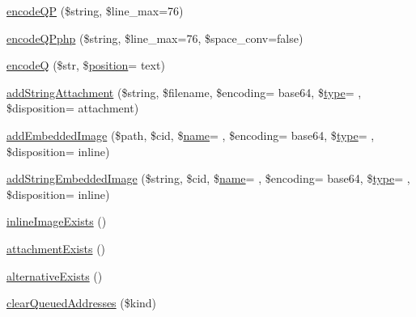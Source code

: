 \begin{DoxyCompactItemize}
\item 
\hyperlink{class_p_h_p_mailer_a8ee2de12dc615c6f5e75642265885ada}{encode\+QP} (\$string, \$line\+\_\+max=76)
\item 
\hyperlink{class_p_h_p_mailer_a4e86849b8958dd59a8f5e67df9bb58c3}{encode\+Q\+Pphp} (\$string, \$line\+\_\+max=76, \$space\+\_\+conv=false)
\item 
\hyperlink{class_p_h_p_mailer_adbbd9f5ed4492196db3f804e7db4d764}{encodeQ} (\$str, \$\hyperlink{jquery-ui_8min_8js_a46cd3bf7f3b19525671d8317c10bdc49}{position}= \textquotesingle{}text\textquotesingle{})
\item 
\hyperlink{class_p_h_p_mailer_a1ac68ff445b3e20a0e61687a6f1a92ae}{add\+String\+Attachment} (\$string, \$filename, \$encoding= \textquotesingle{}base64\textquotesingle{}, \$\hyperlink{_ossn_wall_2actions_2wall_2post_2group_8php_a2dc1bb4e1ed0029daa81ac0776b14b51}{type}= \textquotesingle{}\textquotesingle{}, \$disposition= \textquotesingle{}attachment\textquotesingle{})
\item 
\hyperlink{class_p_h_p_mailer_a6f0beefe8ba70873b02374024d546042}{add\+Embedded\+Image} (\$path, \$cid, \$\hyperlink{user_8php_a765af5e9671743530143a6d3670fd9a6}{name}= \textquotesingle{}\textquotesingle{}, \$encoding= \textquotesingle{}base64\textquotesingle{}, \$\hyperlink{_ossn_wall_2actions_2wall_2post_2group_8php_a2dc1bb4e1ed0029daa81ac0776b14b51}{type}= \textquotesingle{}\textquotesingle{}, \$disposition= \textquotesingle{}inline\textquotesingle{})
\item 
\hyperlink{class_p_h_p_mailer_a7b18e8e4f8c831c4b315d31fe83a04dc}{add\+String\+Embedded\+Image} (\$string, \$cid, \$\hyperlink{user_8php_a765af5e9671743530143a6d3670fd9a6}{name}= \textquotesingle{}\textquotesingle{}, \$encoding= \textquotesingle{}base64\textquotesingle{}, \$\hyperlink{_ossn_wall_2actions_2wall_2post_2group_8php_a2dc1bb4e1ed0029daa81ac0776b14b51}{type}= \textquotesingle{}\textquotesingle{}, \$disposition= \textquotesingle{}inline\textquotesingle{})
\item 
\hyperlink{class_p_h_p_mailer_aca2b58a55c009e10458d59b494d6189d}{inline\+Image\+Exists} ()
\item 
\hyperlink{class_p_h_p_mailer_aa095b5a3a9f25a8c8d1380b246d9e894}{attachment\+Exists} ()
\item 
\hyperlink{class_p_h_p_mailer_ab4ce4785ba565c296f04d1e309c4a138}{alternative\+Exists} ()
\item 
\hyperlink{class_p_h_p_mailer_a419fe05f1e410139292aceb24c25f26b}{clear\+Queued\+Addresses} (\$kind)
\item 

\end{DoxyCompactItemize}
